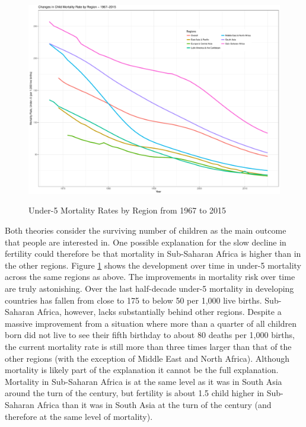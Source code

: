 \documentclass[letterpaper,12pt]{article}
\begin{document}
\begin{figure}[hp!]
    \centering
    \caption{Under-5 Mortality Rates by Region from 1967 to 2015}
    \includegraphics[width=0.75\linewidth]{../figures/childMortalityRates.pdf}
    \label{fig:mortality}
\end{figure}


Both theories consider the surviving number of children as
the main outcome that people are interested in.
One possible explanation for the slow decline in fertility
could therefore be that mortality in Sub-Saharan Africa is
higher than in the other regions.
Figure \ref{fig:mortality} shows the development over time in 
under-5 mortality across the same regions as above.
The improvements in mortality risk over time are truly astonishing.
Over the last half-decade under-5 mortality in developing countries 
has fallen from close to 175 to below 50 per 1,000 live births.
Sub-Saharan Africa, however, lacks substantially behind other regions.
Despite a massive improvement from a situation where more than a
quarter of all children born did not live to see their fifth
birthday to about 80 deaths per 1,000 births, the current mortality 
rate is still more than three times larger than that of the other 
regions (with the exception of Middle East and North Africa).
Although mortality is likely part of the explanation it cannot
be the full explanation.
Mortality in Sub-Saharan Africa is at the same level as it was
in South Asia around the turn of the century, but fertility
is about 1.5 child higher in Sub-Saharan Africa than it was
in South Asia at the turn of the century (and therefore at the
same level of mortality).
\end{document}
